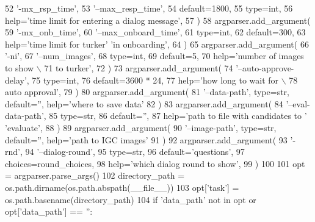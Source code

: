 \begin{DoxyCode}
52         \textcolor{stringliteral}{'-mx\_rsp\_time'},
53         \textcolor{stringliteral}{'--max\_resp\_time'},
54         default=1800,
55         type=int,
56         help=\textcolor{stringliteral}{'time limit for entering a dialog message'},
57     )
58     argparser.add\_argument(
59         \textcolor{stringliteral}{'-mx\_onb\_time'},
60         \textcolor{stringliteral}{'--max\_onboard\_time'},
61         type=int,
62         default=300,
63         help=\textcolor{stringliteral}{'time limit for turker'} \textcolor{stringliteral}{'in onboarding'},
64     )
65     argparser.add\_argument(
66         \textcolor{stringliteral}{'-ni'},
67         \textcolor{stringliteral}{'--num\_images'},
68         type=int,
69         default=5,
70         help=\textcolor{stringliteral}{'number of images to show \(\backslash\)}
71 \textcolor{stringliteral}{                           to turker'},
72     )
73     argparser.add\_argument(
74         \textcolor{stringliteral}{'--auto-approve-delay'},
75         type=int,
76         default=3600 * 24,
77         help=\textcolor{stringliteral}{'how long to wait for  \(\backslash\)}
78 \textcolor{stringliteral}{                           auto approval'},
79     )
80     argparser.add\_argument(
81         \textcolor{stringliteral}{'--data-path'}, type=str, default=\textcolor{stringliteral}{''}, help=\textcolor{stringliteral}{'where to save data'}
82     )
83     argparser.add\_argument(
84         \textcolor{stringliteral}{'--eval-data-path'},
85         type=str,
86         default=\textcolor{stringliteral}{''},
87         help=\textcolor{stringliteral}{'path to file with candidates to '} \textcolor{stringliteral}{'evaluate'},
88     )
89     argparser.add\_argument(
90         \textcolor{stringliteral}{'--image-path'}, type=str, default=\textcolor{stringliteral}{''}, help=\textcolor{stringliteral}{'path to IGC images'}
91     )
92     argparser.add\_argument(
93         \textcolor{stringliteral}{'-rnd'},
94         \textcolor{stringliteral}{'--dialog-round'},
95         type=str,
96         default=\textcolor{stringliteral}{'questions'},
97         choices=round\_choices,
98         help=\textcolor{stringliteral}{'which dialog round to show'},
99     )
100 
101     opt = argparser.parse\_args()
102     directory\_path = os.path.dirname(os.path.abspath(\_\_file\_\_))
103     opt[\textcolor{stringliteral}{'task'}] = os.path.basename(directory\_path)
104     \textcolor{keywordflow}{if} \textcolor{stringliteral}{'data\_path'} \textcolor{keywordflow}{not} \textcolor{keywordflow}{in} opt \textcolor{keywordflow}{or} opt[\textcolor{stringliteral}{'data\_path'}] == \textcolor{stringliteral}{''}:

\end{DoxyCode}
